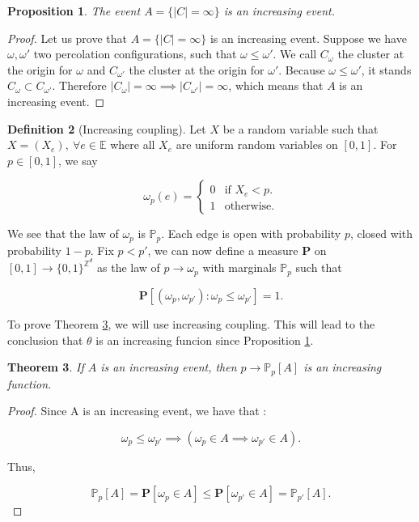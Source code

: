 \documentclass[a4paper,11pt]{article}
\theoremstyle{plain}
\newtheorem{theorem}{Theorem}[section]
\newtheorem{proposition}[theorem]{Proposition}
\theoremstyle{definition}
\newtheorem{definition}[theorem]{Definition}
\theoremstyle{remark}
\begin{document}
\begin{proposition}
\label{increvent_prop}
  The event $A = \{ |C|=\infty \}$ is an increasing event.
\end{proposition}
\begin{proof}
Let us prove that $A = \{ |C|=\infty \}$ is an increasing event.
Suppose we have $\omega, \omega'$ two percolation configurations, such that $\omega \leq \omega'$. We call $C_\omega$ the cluster at the origin for $\omega$ and $C_{\omega'}$ the cluster at the origin for $\omega'$.
Because $\omega \leq \omega'$, it stands $C_{\omega} \subset C_{\omega'}$. Therefore $|C_{\omega}| = \infty \implies |C_{\omega'}| = \infty$, which means that $A$ is an increasing event.
\end{proof}

\begin{definition}[Increasing coupling]
Let $X$ be a random variable such that $X = (X_e), \: \forall e \in \mathbb{E}$ where all $X_e$ are uniform random variables on $[0,1]$.
For $p \in [0,1]$, we say

\[
\omega_p(e) = \left\{
    \begin{array}{ll}
        0 & \text{if $X_e < p$}.\\
        1 & \text{otherwise}.
    \end{array}
\right.
\]

We see that the law of $\omega_p$ is $\mathbb{P}_p$. Each edge is open with probability $p$, closed with probability $1- p$.
Fix $p < p'$, we can now define a measure $\mathbf{P}$ on $[0, 1] \longrightarrow \{0,1\}^{\mathbb{Z}^d}$ as the law of $p \longrightarrow \omega_p$ with marginals $\mathbb{P}_p$ such that

\[ \mathbf{P}[(\omega_p, \omega_{p'}) : \omega_p \leq \omega_{p'}] = 1. \]

\end{definition}

To prove Theorem \ref{increasingevent_theorem}, we will use increasing coupling. This will lead to the conclusion that $\theta$ is an increasing funcion since Proposition \ref{increvent_prop}.

\begin{theorem}
\label{increasingevent_theorem}
  If $A$ is an increasing event, then $p \longrightarrow \mathbb{P}_p[A]$ is an increasing function.
\end{theorem}
\begin{proof}
Since A is an increasing event, we have that :

\[ \omega_p \leq \omega_{p'} \implies (\omega_p \in A \implies \omega_{p'} \in A). \]

Thus,

\[ \mathbb{P}_p[A] = \mathbf{P}[\omega_p \in A] \leq \mathbf{P}[\omega_{p'} \in A] = \mathbb{P}_{p'}[A]. \]

\end{proof}
\end{document}
